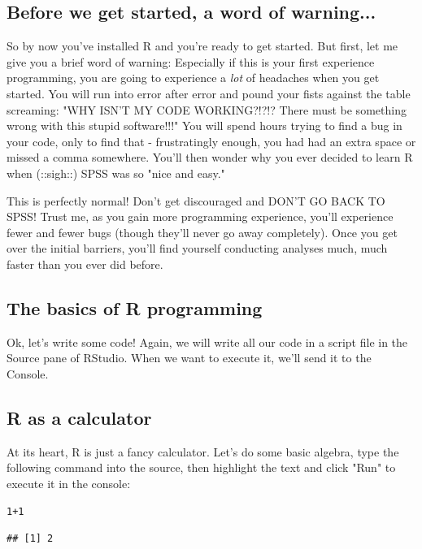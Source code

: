 \documentclass{tufte-book}\usepackage[]{graphicx}\usepackage[]{color}
\makeatletter
\newcommand{\hlnum}[1]{\textcolor[rgb]{0.686,0.059,0.569}{#1}}%
\newcommand{\hlopt}[1]{\textcolor[rgb]{0,0,0}{#1}}%
\newenvironment{kframe}{%
 \def\at@end@of@kframe{}%
 \ifinner\ifhmode%
  \def\at@end@of@kframe{\end{minipage}}%
  \begin{minipage}{\columnwidth}%
 \fi\fi%
 \def\FrameCommand##1{\hskip\@totalleftmargin \hskip-\fboxsep
 \colorbox{shadecolor}{##1}\hskip-\fboxsep
     \hskip-\linewidth \hskip-\@totalleftmargin \hskip\columnwidth}%
 \MakeFramed {\advance\hsize-\width
   \@totalleftmargin\z@ \linewidth\hsize
   \@setminipage}}%
 {\par\unskip\endMakeFramed%
 \at@end@of@kframe}
\newenvironment{knitrout}{}{} %
\makeatother
\begin{document}
\subsection{Before we get started, a word of warning...}

So by now you've installed R and you're ready to get started. But first, let me give you a brief word of warning: Especially if this is your first experience programming, you are going to experience a \textit{lot} of headaches when you get started. You will run into error after error and pound your fists against the table screaming: "WHY ISN'T MY CODE WORKING?!?!? There must be something wrong with this stupid software!!!" You will spend hours trying to find a bug in your code, only to find that - frustratingly enough, you had had an extra space or missed a comma somewhere. You'll then wonder why you ever decided to learn R when (::sigh::) SPSS was so "nice and easy."


This is perfectly normal! Don't get discouraged and DON'T GO BACK TO SPSS! Trust me, as you gain more programming experience, you'll experience fewer and fewer bugs (though they'll never go away completely). Once you get over the initial barriers, you'll find yourself conducting analyses much, much faster than you ever did before.

\subsection{The basics of R programming}

Ok, let's write some code! Again, we will write all our code in a script file in the Source pane of RStudio. When we want to execute it, we'll send it to the Console.

\subsection{R as a calculator}

At its heart, R is just a fancy calculator. Let's do some basic algebra, type the following command into the source, then highlight the text and click "Run" to execute it in the console:



\begin{knitrout}
\color{fgcolor}\begin{kframe}
\begin{alltt}
\hlnum{1}\hlopt{+}\hlnum{1}
\end{alltt}
\begin{verbatim}
## [1] 2
\end{verbatim}
\end{kframe}
\end{knitrout}
\end{document}
